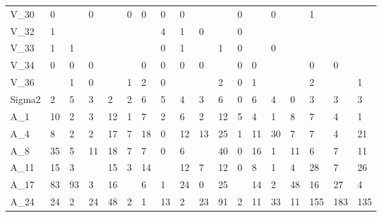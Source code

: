 \begin{tabular}{llllllllllllllllll}
V\_30   &       0 &            &          0 &       &     0 &       0 &     0 &          0 &       &      &    0 &            &      0 &       &     1 &           &                \\
V\_32   &       1 &            &            &       &       &         &     4 &          1 &     0 &      &    0 &            &        &       &       &           &                \\
V\_33   &       1 &          1 &            &       &       &         &     0 &          1 &       &    1 &    0 &            &      0 &       &       &           &                \\
V\_34   &       0 &          0 &          0 &       &       &       0 &     0 &          0 &     0 &      &    0 &          0 &        &       &     0 &         0 &                \\
V\_36   &         &          1 &          0 &       &     1 &       2 &     0 &            &       &    2 &    0 &          1 &        &       &     2 &           &              1 \\
Sigma2 &       2 &          5 &          3 &     2 &     2 &       6 &     5 &          4 &     3 &    6 &    0 &          6 &      4 &     0 &     3 &         3 &              3 \\
A\_1    &      10 &          2 &          3 &    12 &     1 &       7 &     2 &          6 &     2 &   12 &    5 &          4 &      1 &     8 &     7 &         4 &              1 \\
A\_4    &       8 &          2 &          2 &    17 &     7 &      18 &     0 &         12 &    13 &   25 &    1 &         11 &     30 &     7 &     7 &         4 &             21 \\
A\_8    &      35 &          5 &         11 &    18 &     7 &       7 &     0 &          6 &       &   40 &    0 &         16 &      1 &    11 &     6 &         7 &             11 \\
A\_11   &      15 &          3 &            &    15 &     3 &      14 &       &         12 &     7 &   12 &    0 &          8 &      1 &     4 &    28 &         7 &             26 \\
A\_17   &      83 &         93 &          3 &    16 &       &       6 &     1 &         24 &     0 &   25 &      &         14 &      2 &    48 &    16 &        27 &              4 \\
A\_24   &      24 &          2 &         24 &    48 &     2 &       1 &    13 &          2 &    23 &   91 &    2 &         11 &     33 &    11 &   155 &       183 &            135 \\

\end{tabular}

